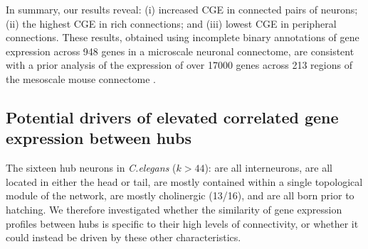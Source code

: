 In summary, our results reveal:
(i) increased CGE in connected pairs of neurons;
(ii) the highest CGE in rich connections; and
(iii) lowest CGE in peripheral connections.
These results, obtained using incomplete binary annotations of gene expression across 948 genes in a microscale neuronal connectome, are consistent with a prior analysis of the expression of over \num{17000} genes across 213 regions of the mesoscale mouse connectome \citep{Fulcher2016}.

\subsection{Potential drivers of elevated correlated gene expression between hubs}
The sixteen hub neurons in \emph{C.elegans} ($k > 44$):
are all interneurons,
are all located in either the head or tail,
are mostly contained within a single topological module of the network,
are mostly cholinergic (13/16),
and are all born prior to hatching.
We therefore investigated whether the similarity of gene expression profiles between hubs is specific to their high levels of connectivity, or whether it could instead be driven by these other characteristics.

